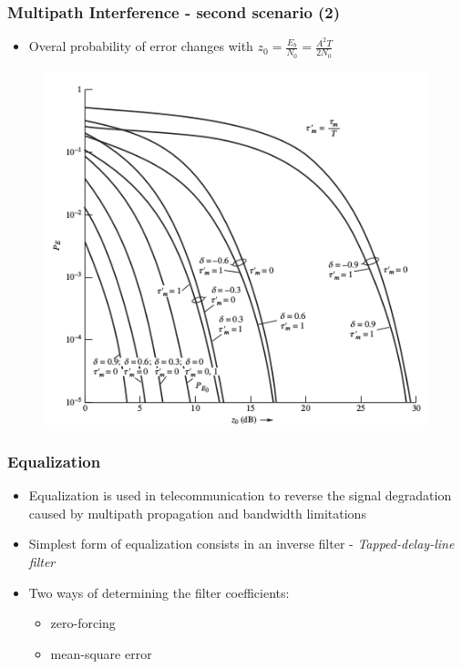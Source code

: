 \documentclass{beamer}
\begin{document}
\begin{frame}
	\frametitle{Multipath Interference - second scenario (2)}
	\begin{itemize}
		\item Overal probability of error changes with $ z_0 = \frac{E_b}{N_0} = \frac{A^2T}{2N_0} $
	\end{itemize}
	\begin{figure}
		\includegraphics[width=\textwidth, height=0.7\textheight, keepaspectratio]{pe_vs_z0.png}
	\end{figure}
\end{frame}


\begin{frame}
	\frametitle{Equalization}
	\begin{itemize}
		\item Equalization is used in telecommunication to reverse the signal degradation caused by multipath propagation and bandwidth limitations
		\item Simplest form of equalization consists in an inverse filter - \emph{Tapped-delay-line filter}
		\item Two ways of determining the filter coefficients:
		\begin{itemize}
			\item zero-forcing
			\item mean-square error
		\end{itemize}
	\end{itemize}
\end{frame}
\end{document}
